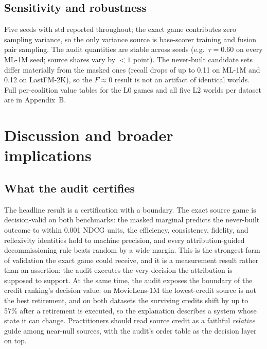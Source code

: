 \documentclass[pdflatex,sn-mathphys-num]{sn-jnl}
\theoremstyle{thmstyleone}%
\theoremstyle{thmstyletwo}%
\theoremstyle{thmstylethree}%
\begin{document}
\subsection{Sensitivity and robustness}\label{subsec4_7}

Five seeds with std reported throughout; the exact game contributes zero sampling variance, so the only variance source is base-scorer training and fusion pair sampling. The audit quantities are stable across seeds (e.g.\ $\tau = 0.60$ on every ML-1M seed; source shares vary by $<1$ point). The never-built candidate sets differ materially from the masked ones (recall drops of up to 0.11 on ML-1M and 0.12 on LastFM-2K), so the $F\approx0$ result is not an artifact of identical worlds. Full per-coalition value tables for the L0 games and all five L2 worlds per dataset are in Appendix~B.

\section{Discussion and broader implications}\label{sec5}

\subsection{What the audit certifies}\label{subsec5_1}

The headline result is a certification with a boundary. The exact source game is decision-valid on both benchmarks: the masked marginal predicts the never-built outcome to within 0.001 NDCG units, the efficiency, consistency, fidelity, and reflexivity identities hold to machine precision, and every attribution-guided decommissioning rule beats random by a wide margin. This is the strongest form of validation the exact game could receive, and it is a measurement result rather than an assertion: the audit executes the very decision the attribution is supposed to support. At the same time, the audit exposes the boundary of the credit ranking's decision value: on MovieLens-1M the lowest-credit source is not the best retirement, and on both datasets the surviving credits shift by up to 57\% after a retirement is executed, so the explanation describes a system whose state it can change. Practitioners should read source credit as a faithful \emph{relative} guide among near-null sources, with the audit's order table as the decision layer on top.
\end{document}
